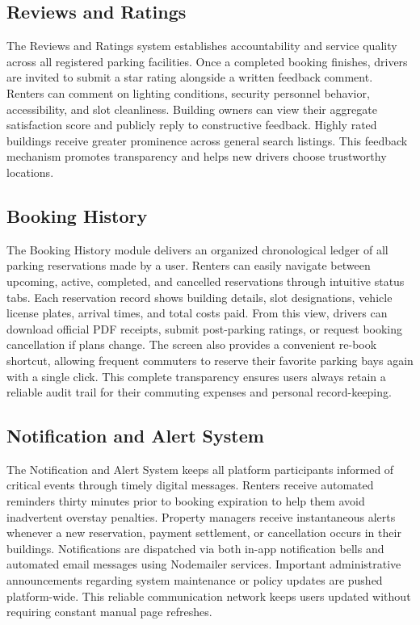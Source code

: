 \documentclass[12pt,a4paper]{article}
\begin{document}
\subsection{Reviews and Ratings}
The Reviews and Ratings system establishes accountability and service quality across all registered parking facilities. Once a completed booking finishes, drivers are invited to submit a star rating alongside a written feedback comment. Renters can comment on lighting conditions, security personnel behavior, accessibility, and slot cleanliness. Building owners can view their aggregate satisfaction score and publicly reply to constructive feedback. Highly rated buildings receive greater prominence across general search listings. This feedback mechanism promotes transparency and helps new drivers choose trustworthy locations.

\subsection{Booking History}
The Booking History module delivers an organized chronological ledger of all parking reservations made by a user. Renters can easily navigate between upcoming, active, completed, and cancelled reservations through intuitive status tabs. Each reservation record shows building details, slot designations, vehicle license plates, arrival times, and total costs paid. From this view, drivers can download official PDF receipts, submit post-parking ratings, or request booking cancellation if plans change. The screen also provides a convenient re-book shortcut, allowing frequent commuters to reserve their favorite parking bays again with a single click. This complete transparency ensures users always retain a reliable audit trail for their commuting expenses and personal record-keeping.

\subsection{Notification and Alert System}
The Notification and Alert System keeps all platform participants informed of critical events through timely digital messages. Renters receive automated reminders thirty minutes prior to booking expiration to help them avoid inadvertent overstay penalties. Property managers receive instantaneous alerts whenever a new reservation, payment settlement, or cancellation occurs in their buildings. Notifications are dispatched via both in-app notification bells and automated email messages using Nodemailer services. Important administrative announcements regarding system maintenance or policy updates are pushed platform-wide. This reliable communication network keeps users updated without requiring constant manual page refreshes.
\end{document}
